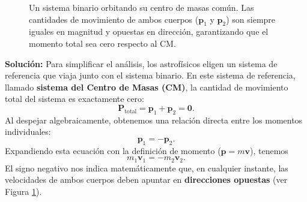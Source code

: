 \documentclass[11pt,a4paper]{book}
\begin{document}
\begin{figure}[htbp]
\centering
{}
\caption{Un sistema binario orbitando su centro de masas común. Las cantidades de movimiento de ambos cuerpos ($\boldsymbol{p}_1$ y $\boldsymbol{p}_2$) son siempre iguales en magnitud y opuestas en dirección, garantizando que el momento total sea cero respecto al CM.}
\label{fig:sistema_binario}
\end{figure}

\textbf{Solución:}
Para simplificar el análisis, los astrofísicos eligen un sistema de referencia que viaja junto con el sistema binario. En este sistema de referencia, llamado \textbf{sistema del Centro de Masas (CM)}, la cantidad de movimiento total del sistema es exactamente cero:
\begin{equation}
    \boldsymbol{P}_{\text{total}} = \boldsymbol{p}_1 + \boldsymbol{p}_2 = \boldsymbol{0}.
\end{equation}
Al despejar algebraicamente, obtenemos una relación directa entre los momentos individuales:
\begin{equation}
    \boldsymbol{p}_1 = -\boldsymbol{p}_2.
\end{equation}
Expandiendo esta ecuación con la definición de momento ($\boldsymbol{p} = m\boldsymbol{v}$), tenemos
\begin{equation}
    m_1 \boldsymbol{v}_1 = - m_2 \boldsymbol{v}_2.
    \label{eq:momento_binario}
\end{equation}
El signo negativo nos indica matemáticamente que, en cualquier instante, las velocidades de ambos cuerpos deben apuntar en \textbf{direcciones opuestas} (ver Figura \ref{fig:sistema_binario}). 
\end{document}
